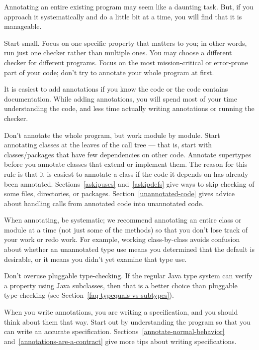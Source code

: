 
Annotating an entire existing program may seem like a daunting task.  But,
if you approach it systematically and do a little bit at a time, you will
find that it is manageable.


Start small.  Focus on one specific property that matters to you; in
other words, run just one checker rather than multiple ones.  You may
choose a different checker for different programs.
Focus on
the most mission-critical or error-prone part of your code; don't try to
annotate your whole program at first.

It is easiest to add annotations if you know the code or the
code contains documentation.  While adding annotations, you will spend most of your time
understanding the code, and less time actually writing annotations
or running the checker.

Don't annotate the whole program, but work module by module.
Start annotating classes at the leaves of the call tree ---
that is,
start with classes/packages that have few dependencies on other
code.
Annotate supertypes before you
annotate classes that extend or implement them.
The reason for this rule is that it is
easiest to annotate a class if the code it depends on has already been
annotated.
Sections~\ref{askipuses} and~\ref{askipdefs} give ways to skip
checking of some files, directories, or packages.
Section~\ref{unannotated-code} gives advice about handling calls from
annotated code into unannotated code.

When annotating, be systematic; we recommend
annotating an entire class or module at a time (not just some of the methods)
so that you don't lose track of your work or redo work.  For example,
working class-by-class avoids confusion about whether an unannotated type use
means you determined that the default is desirable, or it means you didn't
yet examine that type use.

Don't overuse pluggable type-checking.  If the regular Java type system can
verify a property using Java subclasses, then that is a better choice than
pluggable type-checking (see Section~\ref{faq-typequals-vs-subtypes}).



When you write annotations, you are writing a specification, and you should
think about them that way.  Start out by understanding the program so that
you can write an accurate specification.
Sections~\ref{annotate-normal-behavior}
and~\ref{annotations-are-a-contract} give more tips about writing
specifications.

